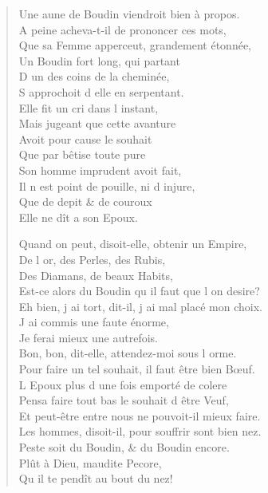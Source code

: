 \documentclass[14pt,a4paper]{memoir}
\begin{document}
{{\begin{otherlanguage}{french}
\begin{verse}
Une aune de Boudin viendroit bien à propos. \\
A peine acheva-t-il de prononcer ces mots, \\
Que sa Femme apperceut, grandement étonnée, \\
\vin Un Boudin fort long, qui partant \\
\vin D\textquotesingle{} un des coins de la cheminée, \\
\vin S\textquotesingle{} approchoit d\textquotesingle{} elle en serpentant. \\
\vin Elle fit un cri dans l\textquotesingle{} instant, \\
\vin Mais jugeant que cette avanture \\
\vin Avoit pour cause le souhait \\
\vin Que par bêtise toute pure \\
\vin Son homme imprudent avoit fait, \\
\vin Il n\textquotesingle{} est point de pouille, ni d\textquotesingle{} injure, \\
\vin Que de depit \& de couroux \\
\vin Elle ne dît a son Epoux.

Quand on peut, disoit-elle, obtenir un Empire, \\
\vin De l\textquotesingle{} or, des Perles, des Rubis, \\
\vin Des Diamans, de beaux Habits, \\
Est-ce alors du Boudin qu\textquotesingle{} il faut que l\textquotesingle{} on desire? \\
Eh bien, j\textquotesingle{} ai tort, dit-il, j\textquotesingle{} ai mal placé mon choix. \\
\vin J\textquotesingle{} ai commis une faute énorme, \\
\vin Je ferai mieux une autrefois. \\
Bon, bon, dit-elle, attendez-moi sous l\textquotesingle{} orme. \\
Pour faire un tel souhait, il faut être bien Bœuf. \\
L\textquotesingle{} Epoux plus d\textquotesingle{} une fois emporté de colere \\
Pensa faire tout bas le souhait d\textquotesingle{} être Veuf, \\
Et peut-être entre nous ne pouvoit-il mieux faire. \\
Les hommes, disoit-il, pour souffrir sont bien nez. \\
Peste soit du Boudin, \& du Boudin encore. \\
\vin Plût à Dieu, maudite Pecore, \\
\vin Qu\textquotesingle{} il te pendît au bout du nez!


\end{verse}
\end{otherlanguage}}}
\end{document}
